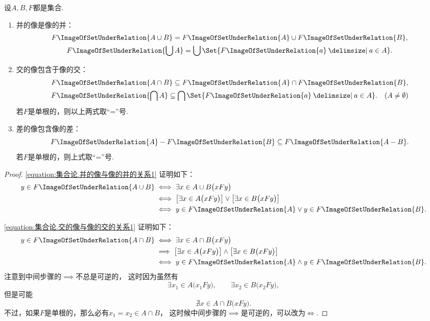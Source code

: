 \begin{theorem}
设\(A,B,F\)都是集合.
\def\F#1{F\ImageOfSetUnderRelation{#1}}
\begin{enumerate}
	\item 并的像是像的并：\begin{gather}
		\F{A \cup B}
		= \F{A} \cup \F{B},
		\label{equation:集合论.并的像与像的并的关系1} \\
		\F{\bigcup A}
		= \bigcup\Set{ \F{a} \given a \in A }.
		\label{equation:集合论.并的像与像的并的关系2}
	\end{gather}

	\item 交的像包含于像的交：\begin{gather}
		\F{A \cap B}
		\subseteq \F{A} \cap \F{B},
		\label{equation:集合论.交的像与像的交的关系1} \\
		\F{\bigcap A}
		\subseteq \bigcap\Set{ \F{a} \given a \in A }.
		\label{equation:集合论.交的像与像的交的关系2}
		\quad(A \neq \emptyset)
	\end{gather}
	若\(F\)是单根的，则以上两式取“=”号.

	\item 差的像包含像的差：\begin{equation}
		\F{A} - \F{B}
		\subseteq \F{A-B}.
		\label{equation:集合论.差的像与像的差的关系}
	\end{equation}
	若\(F\)是单根的，则上式取“=”号.
\end{enumerate}
\begin{proof}
\cref{equation:集合论.并的像与像的并的关系1} 证明如下：
\begin{align*}
	y \in \F{A \cup B}
	&\iff \exists x \in A \cup B \bigl( x F y \bigr) \\
	&\iff \bigl[ \exists x \in A \bigl( x F y \bigr) \bigr]
			\lor \bigl[ \exists x \in B \bigl( x F y \bigr) \bigr] \\
	&\iff y \in \F{A} \lor y \in \F{B}.
\end{align*}

\cref{equation:集合论.交的像与像的交的关系1} 证明如下：
\begin{align*}
	y \in \F{A \cap B}
	&\iff \exists x \in A \cap B \bigl( x F y \bigr) \\
	&\implies \bigl[ \exists x \in A \bigl( x F y \bigr) \bigr]
			\land \bigl[ \exists x \in B \bigl( x F y \bigr) \bigr] \\
	&\iff y \in \F{A} \land y \in \F{B}.
\end{align*}
注意到中间步骤的\(\implies\)不总是可逆的，
这时因为虽然有\[
	\exists x_1 \in A \bigl( x_1 F y \bigr), \qquad
	\exists x_2 \in B \bigl( x_2 F y \bigr),
\]
但是可能\[
	\nexists x \in A \cap B \bigl( x F y \bigr).
\]
不过，如果\(F\)是单根的，那么必有\(x_1 = x_2 \in A \cap B\)，
这时候中间步骤的\(\implies\)是可逆的，可以改为\(\iff\).


\end{proof}
\end{theorem}
